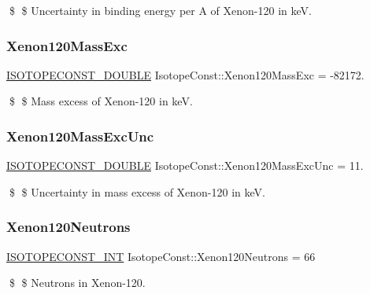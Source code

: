 \$ \$ Uncertainty in binding energy per A of Xenon-\/120 in keV. \mbox{\label{group___isotope_const-_xenon-_xe120_gaa755d3c55e1ffe8d25213a2af90e198f}} 
\subsubsection{\texorpdfstring{Xenon120\+Mass\+Exc}{Xenon120MassExc}}
{\footnotesize\ttfamily \mbox{\hyperlink{group___isotope_const-_macros_ga8f45a7272ce02c0b4c65c44636ed719a}{I\+S\+O\+T\+O\+P\+E\+C\+O\+N\+S\+T\+\_\+\+D\+O\+U\+B\+LE}} Isotope\+Const\+::\+Xenon120\+Mass\+Exc = -\/82172.}

\$ \$ Mass excess of Xenon-\/120 in keV. \mbox{\label{group___isotope_const-_xenon-_xe120_ga8eaf085251144a17d67bd8a25a6c94ec}} 
\subsubsection{\texorpdfstring{Xenon120\+Mass\+Exc\+Unc}{Xenon120MassExcUnc}}
{\footnotesize\ttfamily \mbox{\hyperlink{group___isotope_const-_macros_ga8f45a7272ce02c0b4c65c44636ed719a}{I\+S\+O\+T\+O\+P\+E\+C\+O\+N\+S\+T\+\_\+\+D\+O\+U\+B\+LE}} Isotope\+Const\+::\+Xenon120\+Mass\+Exc\+Unc = 11.}

\$ \$ Uncertainty in mass excess of Xenon-\/120 in keV. \mbox{\label{group___isotope_const-_xenon-_xe120_gaa4719d12c909c03c1bf8dfccb81d6556}} 
\subsubsection{\texorpdfstring{Xenon120\+Neutrons}{Xenon120Neutrons}}
{\footnotesize\ttfamily \mbox{\hyperlink{group___isotope_const-_macros_ga5f18360b3e99483a35c32d789e62621c}{I\+S\+O\+T\+O\+P\+E\+C\+O\+N\+S\+T\+\_\+\+I\+NT}} Isotope\+Const\+::\+Xenon120\+Neutrons = 66}

\$ \$ Neutrons in Xenon-\/120. \mbox{\label{group___isotope_const-_xenon-_xe120_ga835b7d6b04906dff91cb4f7c5fd80632}} 
